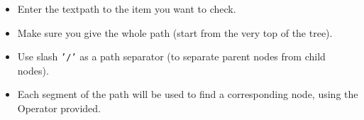 \begin{itemize}
\item Enter the textpath to the item you want to check.
\item Make sure you give the whole path (start from the very top of the tree).
\item Use slash {\tt '/'} as a path separator (to separate parent nodes from child nodes).
\item Each segment of the path will be used to find a corresponding node, using the Operator provided.
  \end{itemize}
